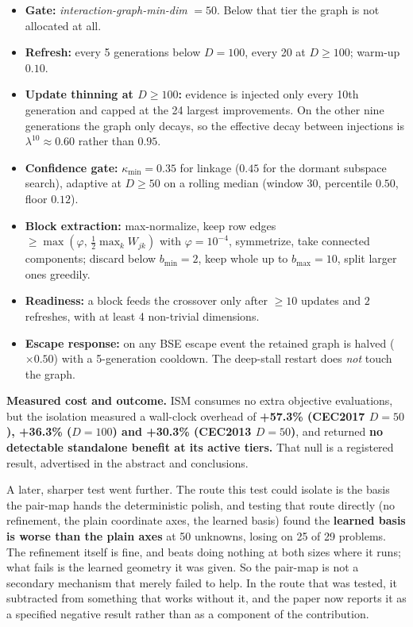 \documentclass[11pt,a4paper]{article}
\newcommand{\hl}[1]{\textbf{#1}}
\begin{document}
\begin{itemize}[leftmargin=1.2em, itemsep=1pt, topsep=3pt]
\item \textbf{Gate:} \textit{interaction-graph-min-dim} $= 50$. Below that
      tier the graph is not allocated at all.
\item \textbf{Refresh:} every 5 generations below $D=100$, every 20 at
      $D\geq100$; warm-up $0.10$.
\item \textbf{Update thinning at $D\geq100$:} evidence is injected only every
      10th generation and capped at the 24 largest improvements. On the other
      nine generations the graph only decays, so the effective decay between
      injections is $\lambda^{10}\approx0.60$ rather than $0.95$.
\item \textbf{Confidence gate:} $\kappa_{\min} = 0.35$ for linkage ($0.45$ for
      the dormant subspace search), adaptive at $D\geq50$ on a rolling median
      (window 30, percentile $0.50$, floor $0.12$).
\item \textbf{Block extraction:} max-normalize, keep row edges
      $\geq \max(\varphi,\, \tfrac12 \max_k W_{jk})$ with $\varphi = 10^{-4}$,
      symmetrize, take connected components; discard below $b_{\min} = 2$, keep
      whole up to $b_{\max} = 10$, split larger ones greedily.
\item \textbf{Readiness:} a block feeds the crossover only after $\geq 10$
      updates and $2$ refreshes, with at least 4 non-trivial dimensions.
\item \textbf{Escape response:} on any BSE escape event the retained graph is
      halved ($\times 0.50$) with a 5-generation cooldown. The deep-stall
      restart does \emph{not} touch the graph.
\end{itemize}

\hl{Measured cost and outcome.} ISM consumes no extra objective evaluations,
but the isolation measured a wall-clock overhead of \hl{+57.3\% (CEC2017
$D{=}50$), +36.3\% ($D{=}100$) and +30.3\% (CEC2013 $D{=}50$)}, and returned
\hl{no detectable standalone benefit at its active tiers.} That null is a
registered result, advertised in the abstract and conclusions.

A later, sharper test went further. The route this test could isolate is the
basis the pair-map hands the deterministic polish, and testing that route
directly (no refinement, the plain coordinate axes, the learned basis) found
the \hl{learned basis is worse than the plain axes} at 50 unknowns, losing on 25
of 29 problems. The refinement itself is fine, and beats doing nothing at both
sizes where it runs; what fails is the learned geometry it was given. So the
pair-map is not a secondary mechanism that merely failed to help. In the route
that was tested, it subtracted from something that works
without it, and the paper now reports it as a specified negative result rather
than as a component of the contribution.
\end{document}
